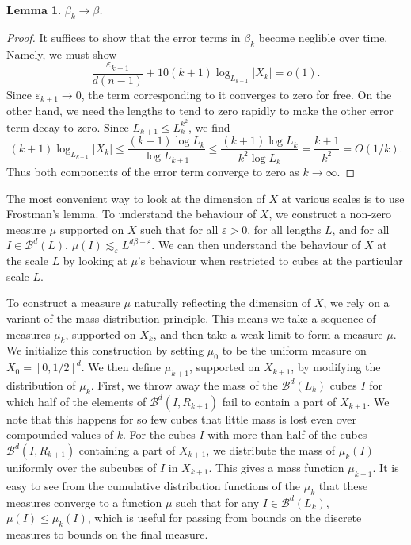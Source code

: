 \documentclass[usenames,dvipsnames]{article}
\theoremstyle{plain}
\newtheorem{lemma}{Lemma}
\theoremstyle{plain}
\begin{document}
\begin{lemma}
	$\beta_k \to \beta$.
\end{lemma}
\begin{proof}
	It suffices to show that the error terms in $\beta_k$ become neglible over time. Namely, we must show
	\[ \frac{\varepsilon_{k+1}}{d(n-1)} + 10(k+1) \log_{L_{k+1}} |X_k| = o(1). \]
	Since $\varepsilon_{k+1} \to 0$, the term corresponding to it converges to zero for free. On the other hand, we need the lengths to tend to zero rapidly to make the other error term decay to zero. Since $L_{k+1} \leq L_k^{k^2}$, we find
	\[ (k+1) \log_{L_{k+1}} |X_k| \leq \frac{(k+1) \log L_k}{\log L_{k+1}} \leq \frac{(k+1) \log L_k}{k^2 \log L_k} = \frac{k+1}{k^2} = O(1/k). \]
	Thus both components of the error term converge to zero as $k \to \infty$.
\end{proof}

The most convenient way to look at the dimension of $X$ at various scales is to use Frostman's lemma. To understand the behaviour of $X$, we construct a non-zero measure $\mu$ supported on $X$ such that for all $\varepsilon > 0$, for all lengths $L$, and for all $I \in \mathcal{B}^d(L)$, $\mu(I) \lesssim_\varepsilon L^{d\beta - \varepsilon}$. We can then understand the behaviour of $X$ at the scale $L$ by looking at $\mu$'s behaviour when restricted to cubes at the particular scale $L$.

To construct a measure $\mu$ naturally reflecting the dimension of $X$, we rely on a variant of the mass distribution principle. This means we take a sequence of measures $\mu_k$, supported on $X_k$, and then take a weak limit to form a measure $\mu$. We initialize this construction by setting $\mu_0$ to be the uniform measure on $X_0 = [0,1/2]^d$. We then define $\mu_{k+1}$, supported on $X_{k+1}$, by modifying the distribution of $\mu_k$. First, we throw away the mass of the $\mathcal{B}^d(L_k)$ cubes $I$ for which half of the elements of $\mathcal{B}^d(I,R_{k+1})$ fail to contain a part of $X_{k+1}$. We note that this happens for so few cubes that little mass is lost even over compounded values of $k$. For the cubes $I$ with more than half of the cubes $\mathcal{B}^d(I,R_{k+1})$ containing a part of $X_{k+1}$, we distribute the mass of $\mu_k(I)$ uniformly over the subcubes of $I$ in $X_{k+1}$. This gives a mass function $\mu_{k+1}$. It is easy to see from the cumulative distribution functions of the $\mu_k$ that these measures converge to a function $\mu$ such that for any $I \in \mathcal{B}^d(L_k)$, $\mu(I) \leq \mu_k(I)$, which is useful for passing from bounds on the discrete measures to bounds on the final measure.
\end{document}
